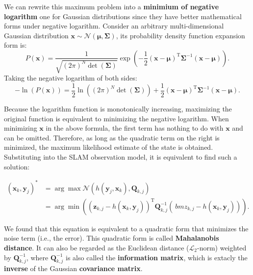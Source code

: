 We can rewrite this maximum problem into a \textbf{minimium of negative logarithm} one for Gaussian distributions since they have better mathematical forms under negative logarithm. Consider an arbitrary multi-dimensional Gaussian distribution $\mathbf{x} \sim \mathcal{N}(\mathbf{\mu}, \boldsymbol{\Sigma})$, its probability density function expansion form is:
\begin{equation}
	P\left( \mathbf{x} \right) = \frac{1}{{\sqrt {{{(2\pi )}^N}\det (\boldsymbol{\Sigma} )} }}\exp \left( {-\frac{1}{2}{{\left( {\mathbf{x}-\mathbf{\mu}} \right)}^\mathrm{T}}{ \boldsymbol{\Sigma} ^ {-1}}\left( {\mathbf{x}-\mathbf{\mu}} \right)} \right).
\end{equation}
Taking the negative logarithm of both sides:
\begin{equation}
	-\ln \left( {P\left( \mathbf{x} \right)} \right) = \frac{1}{2}\ln \left( {{{\left( {2\pi} \right )}^N}\det \left( \boldsymbol{\Sigma} \right)} \right) + \frac{1}{2}{\left( {\mathbf{x}-\mathbf{\mu}} \right)^\mathrm{T}}{\boldsymbol{\Sigma} ^{-1}}\left( {\mathbf{x}-\mathbf{\mu}} \right).
\end{equation}

Because the logarithm function is monotonically increasing, maximizing the original function is equivalent to minimizing the negative logarithm. When minimizing $\mathbf{x}$ in the above formula, the first term has nothing to do with $\mathbf{x}$ and can be omitted. Therefore, as long as the quadratic term on the right is minimized, the maximum likelihood estimate of the state is obtained. Substituting into the SLAM observation model, it is equivalent to find such a solution:

\begin{equation}
	\begin{aligned}
		(\mathbf{x}_k,\mathbf{y}_j)^* &= \arg \max \mathcal{N}(h(\mathbf{y}_j, \mathbf{x}_k), \mathbf{Q }_{k,j}) \\ &= \arg \min \left( {{{\left( {{ \mathbf{z}_{k,j}}-h\left( {{\mathbf{x }_k},{\mathbf{y}_j}} \right)} \right)}^\mathrm{T}} \mathbf{Q}_{k,j}^{-1}\left( {{\ bm{z}_{k,j}}-h\left( {{\mathbf{x}_k},{\mathbf{y}_j}} \right)} \right)} \right).
	\end{aligned}
\end{equation}

We found that this equation is equivalent to a quadratic form that minimizes the noise term (i.e., the error). This quadratic form is called \textbf{Mahalanobis distance}. It can also be regarded as the Euclidean distance ($\mathcal{L}_2$-norm) weighted by $\mathbf{Q}_{k,j}^{-1}$, where $\mathbf{Q}_{k,j} ^{-1}$ is also called the \textbf{information matrix}, which is extacly the \textbf{inverse} of the Gaussian  \textbf{covariance matrix}.

